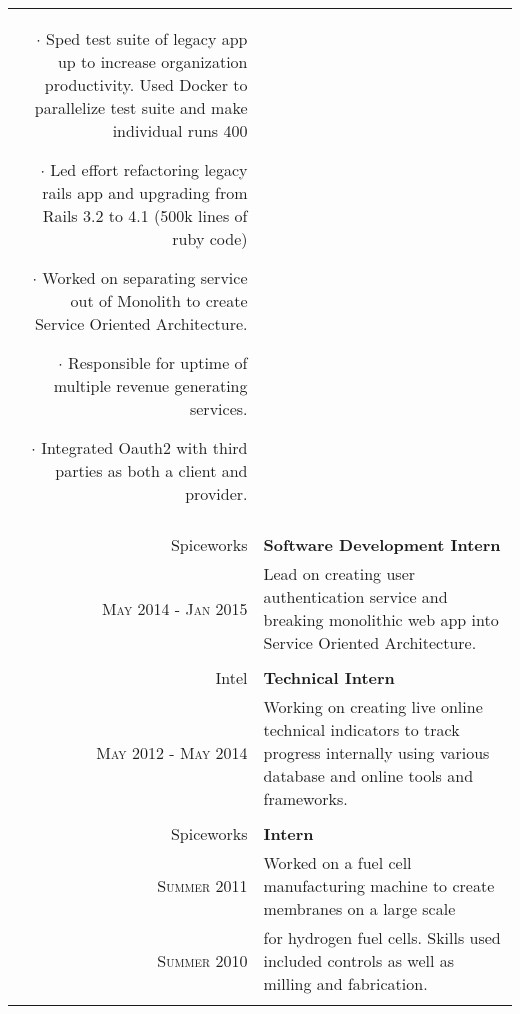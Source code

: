 \documentclass[a4paper,10pt]{article}
\begin{document}
\begin{tabular}{r|p{11cm}}
{		 $\cdot$ Sped test suite of legacy app up to increase organization productivity. Used Docker to parallelize test suite and make individual runs 400%

		 $\cdot$
		 Led effort refactoring legacy rails app and upgrading from Rails 3.2 to 4.1 (500k lines of ruby code)

		 $\cdot$
		 Worked on separating service out of Monolith to create Service Oriented Architecture.

		 $\cdot$
		 Responsible for uptime of multiple revenue generating services.

		 $\cdot$
		 Integrated Oauth2 with third parties as both a client and provider.

	 }
	 \\\multicolumn{2}{c}{} \\

 Spiceworks & \textbf{Software Development Intern} \\
 \textsc{May 2014 - Jan 2015} &
	\footnotesize{
		Lead on creating user authentication service and breaking monolithic web app
		into Service Oriented Architecture.
	}
	\\\multicolumn{2}{c}{} \\

Intel & \textbf{Technical Intern} \\
\textsc{May 2012 - May 2014} &
 \footnotesize{
	 Working on creating live online technical indicators to track progress
	 internally using various database and online tools and frameworks.
 }
 \\\multicolumn{2}{c}{} \\

Spiceworks & \textbf{Intern} \\
\textsc{Summer 2011} &
\footnotesize{
	Worked on a fuel cell manufacturing machine to create membranes on a large
	scale}
	\\

	\textsc{Summer 2010} &
\footnotesize{
	for hydrogen fuel cells. Skills used included controls as well as
	milling and fabrication.
}
\\\multicolumn{2}{c}{} \\

\end{tabular}

\end{document}
